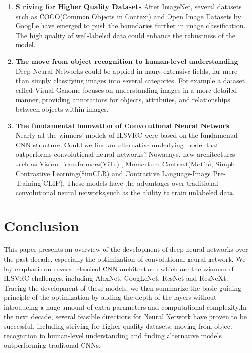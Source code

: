 \documentclass[a4paper]{article}
\begin{document}
\begin{enumerate}
    \item \textbf{Striving for Higher Quality Datasets}
    After ImageNet, several datasets such as \href{https://cocodataset.org/}{COCO(Common Objects in Context)} and \href{https://storage.googleapis.com/openimages/web/index.html}{Open Image Datasets} by GoogLe have emerged to push the boundaries further in image classification. The high quality of well-labeled data could enhance the robustness of the model. 
    \item \textbf{The move from object recognition to human-level understanding}
    Deep Neural Networks could be applied in many extensive fields, far more than simply classifying images into several categories. For example a dataset called Visual Genome \citep{DBLP:journals/corr/KrishnaZGJHKCKL16} focuses on understanding images in a more detailed manner, providing annotations for objects, attributes, and relationships between objects within images.
    \item \textbf{The fundamental innovation of Convolutional Neural Network}
    Nearly all the winners' models of ILSVRC were based on the fundamental CNN structure. Could we find an alternative underlying model that outperforms convolutional neural networks? Nowadays, new architectures such as Vision Transformers(ViTs) \citep{DBLP:journals/corr/abs-2010-11929}, Momentum Contrast(MoCo)\citep{DBLP:journals/corr/abs-1911-05722}, Simple Contrastive Learning(SimCLR)\citep{DBLP:journals/corr/abs-2002-05709} and Contrastive Language-Image Pre-Training(CLIP)\citep{chen2024contrastivelocalizedlanguageimagepretraining}. These models have the advantages over traditional convolutional neural networks,such as the ability to train unlabeled data.
\end{enumerate}


\section{Conclusion}

This paper presents an overview of the development of deep neural networks over the past decade, especially the optimization of convolutional neural network. We lay emphasis on several classical CNN architectures which are the winners of ILSVRC challenges, including AlexNet, GoogLeNet, ResNet and ResNeXt. Tracing the development of these models, we then summarize the basic guiding principle of the optimization by adding the depth of the layers without introducing a huge amount of extra parameters and computational complexity.In the next decade, several feasible directions for Neural Network have proven to be successful, including striving for higher quality datasets, moving from object recognition to human-level understanding and finding alternative models outperforming traditonal CNNs.

\newpage


\end{document}
